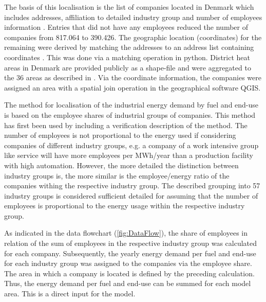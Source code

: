 \documentclass[review]{elsarticle}
\begin{document}
The basis of this localisation is the list of companies located in Denmark which includes addresses, affiliation to detailed industry group and number of employees information \cite{virk2017}. Entries that did not have any employees reduced the number of companies from 817.064 to 390.426. The geographic location (coordinates) for the remaining were derived by matching the addresses to an address list containing coordinates \cite{aws2017}. This was done via a matching operation in python. District heat areas in Denmark are provided publicly as a shape-file \cite{forsyningsomraade2017} and were aggregated to the 36 areas as described in \cite{Petrovic2014}. Via the coordinate information, the companies were assigned an area with a spatial join operation in the geographical software QGIS.

The method for localisation of the industrial energy demand by fuel and end-use is based on the employee shares of industrial groups of companies. This method has first been used by \cite{Buhler2017} including a verification description of the method. The number of employees is not proportional to the energy used if considering companies of different industry groups, e.g. a company of a work intensive group like service will have more employees per MWh/year than a production facility with high automation. However, the more detailed the distinction between industry groups is, the more similar is the employee/energy ratio of the companies withing the respective industry group. The described grouping into 57 industry groups is considered sufficient detailed for assuming that the number of employees is proportional to the energy usage within the respective industry group.

As indicated in the data flowchart (\autoref{fig:DataFlow}), the share of employees in relation of the sum of employees in the respective industry group was calculated for each company. Subsequently, the yearly energy demand per fuel and end-use for each industry group was assigned to the companies via the employee share. The area in which a company is located is defined by the preceding calculation. Thus, the energy demand per fuel and end-use can be summed for each model area. This is a direct input for the model.

\end{document}
